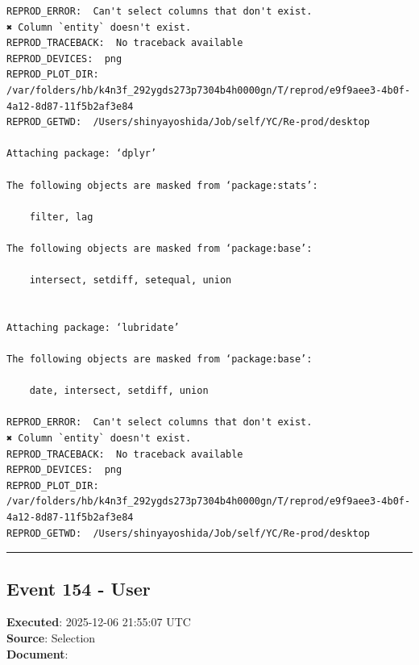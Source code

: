 \documentclass[
  11pt,
]{article}
\newenvironment{rpoutput}{\vspace{0.5em}\begin{snugshade}}{\end{snugshade}}
\begin{document}
\begin{rpoutput}

\begin{verbatim}
REPROD_ERROR:  Can't select columns that don't exist.
✖ Column `entity` doesn't exist. 
REPROD_TRACEBACK:  No traceback available  
REPROD_DEVICES:  png 
REPROD_PLOT_DIR:  /var/folders/hb/k4n3f_292ygds273p7304b4h0000gn/T/reprod/e9f9aee3-4b0f-4a12-8d87-11f5b2af3e84 
REPROD_GETWD:  /Users/shinyayoshida/Job/self/YC/Re-prod/desktop 

Attaching package: ‘dplyr’

The following objects are masked from ‘package:stats’:

    filter, lag

The following objects are masked from ‘package:base’:

    intersect, setdiff, setequal, union


Attaching package: ‘lubridate’

The following objects are masked from ‘package:base’:

    date, intersect, setdiff, union

REPROD_ERROR:  Can't select columns that don't exist.
✖ Column `entity` doesn't exist. 
REPROD_TRACEBACK:  No traceback available  
REPROD_DEVICES:  png 
REPROD_PLOT_DIR:  /var/folders/hb/k4n3f_292ygds273p7304b4h0000gn/T/reprod/e9f9aee3-4b0f-4a12-8d87-11f5b2af3e84 
REPROD_GETWD:  /Users/shinyayoshida/Job/self/YC/Re-prod/desktop 
\end{verbatim}

\end{rpoutput}

\begin{center}\rule{0.5\linewidth}{0.5pt}\end{center}

\subsection{Event 154 - User}\label{event-154---user}

\textbf{Executed}: 2025-12-06 21:55:07 UTC\\
\textbf{Source}: Selection\\
\textbf{Document}:
\end{document}
